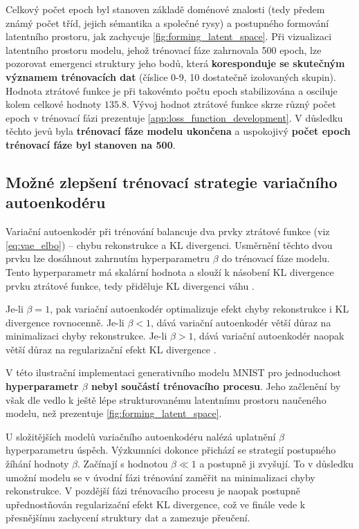 Celkový počet epoch byl stanoven základě doménové znalosti (tedy předem známý počet tříd, jejich sémantika a společné rysy) a postupného formování latentního prostoru, jak zachycuje \autoref{fig:forming_latent_space}.
Při vizualizaci latentního prostoru modelu, jehož trénovací fáze zahrnovala 500 epoch, lze pozorovat emergenci struktury jeho bodů, která \textbf{koresponduje se skutečným významem trénovacích dat} (číslice 0-9, 10 dostatečně izolovaných skupin).
Hodnota ztrátové funkce je při takovémto počtu epoch stabilizována a osciluje kolem celkové hodnoty $135.8$. Vývoj hodnot ztrátové funkce skrze různý počet epoch v trénovací fázi prezentuje \autoref{app:loss_function_development}.
V důsledku těchto jevů byla \textbf{trénovací fáze modelu ukončena} a uspokojivý \textbf{počet epoch trénovací fáze byl stanoven na 500}.

\subsection{Možné zlepšení trénovací strategie variačního autoenkodéru}
Variační autoenkodér při trénování balancuje dva prvky ztrátové funkce (viz \autoref{eq:vae_elbo}) – chybu rekonstrukce a KL divergenci.
Usměrnění těchto dvou prvku lze dosáhnout zahrnutím hyperparametru $\beta$ do trénovací fáze modelu. 
Tento hyperparametr má skalární hodnota a slouží k násobení KL divergence prvku ztrátové funkce, tedy přiděluje KL divergenci váhu \cite{Higgins2022}.

Je-li $\beta = 1$, pak variační autoenkodér optimalizuje efekt chyby rekonstrukce i KL divergence rovnocenně.   
Je-li $\beta < 1$, dává variační autoenkodér větší důraz na minimalizaci chyby rekonstrukce.
Je-li $\beta > 1$, dává variační autoenkodér naopak větší důraz na regularizační efekt KL divergence \cite{Higgins2022}.

V této ilustrační implementaci generativního modelu MNIST pro jednoduchost \textbf{hyperparametr $\beta$ nebyl součástí trénovacího procesu}.
Jeho začlenění by však dle \textcite{Higgins2022} vedlo k ještě lépe strukturovanému latentnímu prostoru naučeného modelu, než prezentuje \autoref{fig:forming_latent_space}.

U složitějších modelů variačního autoenkodéru nalézá uplatnění $\beta$ hyperparametru úspěch.
Výzkumníci \textcite{Sankarapandian2021} dokonce přichází se strategií postupného žíhání hodnoty $\beta$.
Začínají s hodnotou $\beta \ll 1$ a postupně ji zvyšují.
To v důsledku umožní modelu se v úvodní fázi trénování zaměřit na minimalizaci chyby rekonstrukce.
V pozdější fázi trénovacího procesu je naopak postupně upřednostňován regularizační efekt KL divergence, což ve finále vede k přesnějšímu zachycení struktury dat a zamezuje přeučení.

